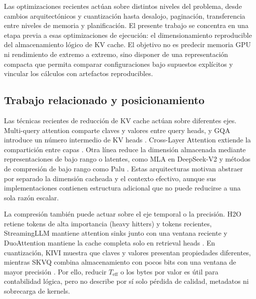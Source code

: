 \documentclass[a4paper,twocolumn]{article}
\begin{document}
Las optimizaciones recientes actúan sobre distintos niveles del problema, desde cambios arquitectónicos y cuantización hasta desalojo, paginación, transferencia entre niveles de memoria y planificación. El presente trabajo se concentra en una etapa previa a esas optimizaciones de ejecución: el dimensionamiento reproducible del almacenamiento lógico de KV cache. El objetivo no es predecir memoria GPU ni rendimiento de extremo a extremo, sino disponer de una representación compacta que permita comparar configuraciones bajo supuestos explícitos y vincular los cálculos con artefactos reproducibles.

\subsection{Trabajo relacionado y posicionamiento}
Las técnicas recientes de reducción de KV cache actúan sobre diferentes ejes. Multi-query attention comparte claves y valores entre query heads, y GQA introduce un número intermedio de KV heads \cite{shazeer2019fast,ainslie2023gqa}. Cross-Layer Attention extiende la compartición entre capas \cite{brandon2024crosslayer}. Otra línea reduce la dimensión almacenada mediante representaciones de bajo rango o latentes, como MLA en DeepSeek-V2 y métodos de compresión de bajo rango como Palu \cite{deepseek2024v2,chang2025palu}. Estas arquitecturas motivan abstraer por separado la dimensión cacheada y el contexto efectivo, aunque sus implementaciones contienen estructura adicional que no puede reducirse a una sola razón escalar.

La compresión también puede actuar sobre el eje temporal o la precisión. H2O retiene tokens de alta importancia (heavy hitters) y tokens recientes, StreamingLLM mantiene attention sinks junto con una ventana reciente y DuoAttention mantiene la cache completa solo en retrieval heads \cite{zhang2023h2o,xiao2024streamingllm,xiao2025duoattention}. En cuantización, KIVI muestra que claves y valores presentan propiedades diferentes, mientras SKVQ combina almacenamiento con pocos bits con una ventana de mayor precisión \cite{liu2024kivi,duanmu2024skvq}. Por ello, reducir $T_{\mathrm{eff}}$ o los bytes por valor es útil para contabilidad lógica, pero no describe por sí solo pérdida de calidad, metadatos ni sobrecarga de kernels.
\end{document}
